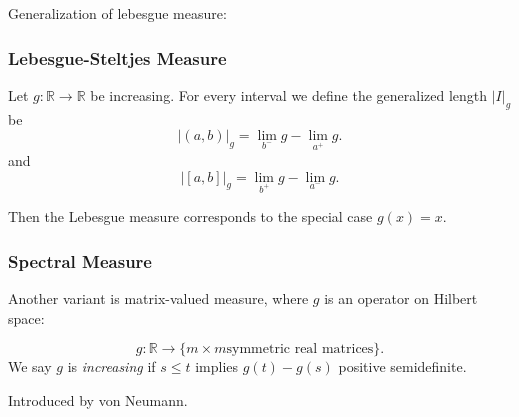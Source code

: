 Generalization of lebesgue measure: 
\subsubsection{Lebesgue-Steltjes Measure}

Let $g: \mathbb{R} \to  \mathbb{R}$ be increasing. For every interval we define the generalized length $|I|_g$ be
\[
	|(a,b)|_g = \lim_{b^-} g - \lim_{a^+} g 
.\] 
and
\[
	|[a,b]|_g = \lim_{b^+} g - \lim_{a^-} g
.\] 

Then the Lebesgue measure corresponds to the special case $g(x) = x$.

\subsubsection{Spectral Measure}

Another variant is matrix-valued measure, where $g$ is an operator on Hilbert space:

\[
	g: \mathbb{R} \to  \{m \times m \text{symmetric real matrices}\}  
.\] 
We say $g$ is  \textit{increasing} if $s\le t$ implies $g(t) - g(s)$ positive semidefinite.

Introduced by von Neumann.

